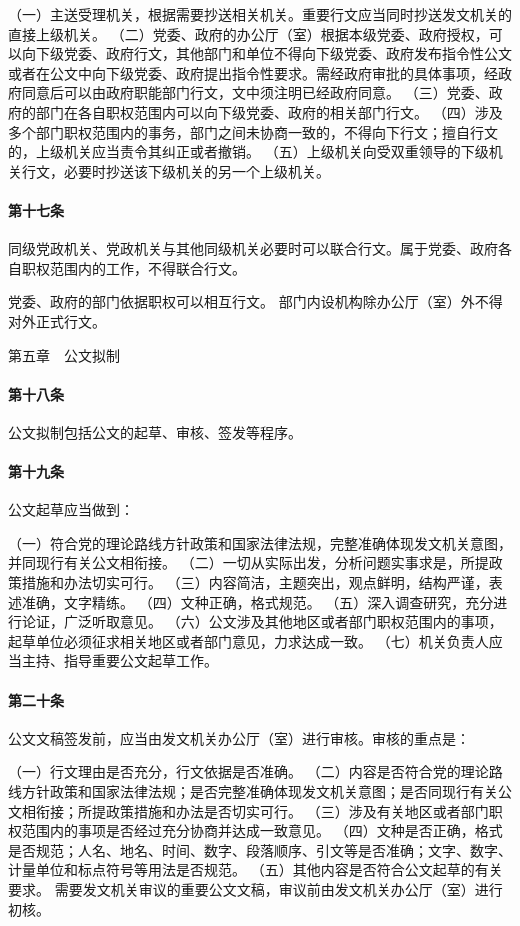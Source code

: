 \documentclass{gbt9704}
\begin{document}
（一）主送受理机关，根据需要抄送相关机关。重要行文应当同时抄送发文机关的直接上级机关。
（二）党委、政府的办公厅（室）根据本级党委、政府授权，可以向下级党委、政府行文，其他部门和单位不得向下级党委、政府发布指令性公文或者在公文中向下级党委、政府提出指令性要求。需经政府审批的具体事项，经政府同意后可以由政府职能部门行文，文中须注明已经政府同意。
（三）党委、政府的部门在各自职权范围内可以向下级党委、政府的相关部门行文。
（四）涉及多个部门职权范围内的事务，部门之间未协商一致的，不得向下行文；擅自行文的，上级机关应当责令其纠正或者撤销。
（五）上级机关向受双重领导的下级机关行文，必要时抄送该下级机关的另一个上级机关。
\paragraph{第十七条}
同级党政机关、党政机关与其他同级机关必要时可以联合行文。属于党委、政府各自职权范围内的工作，不得联合行文。

党委、政府的部门依据职权可以相互行文。
部门内设机构除办公厅（室）外不得对外正式行文。

第五章　公文拟制


\paragraph{第十八条}
公文拟制包括公文的起草、审核、签发等程序。

\paragraph{第十九条}
公文起草应当做到：

（一）符合党的理论路线方针政策和国家法律法规，完整准确体现发文机关意图，并同现行有关公文相衔接。
（二）一切从实际出发，分析问题实事求是，所提政策措施和办法切实可行。
（三）内容简洁，主题突出，观点鲜明，结构严谨，表述准确，文字精练。
（四）文种正确，格式规范。
（五）深入调查研究，充分进行论证，广泛听取意见。
（六）公文涉及其他地区或者部门职权范围内的事项，起草单位必须征求相关地区或者部门意见，力求达成一致。
（七）机关负责人应当主持、指导重要公文起草工作。
\paragraph{第二十条}
公文文稿签发前，应当由发文机关办公厅（室）进行审核。审核的重点是：

（一）行文理由是否充分，行文依据是否准确。
（二）内容是否符合党的理论路线方针政策和国家法律法规；是否完整准确体现发文机关意图；是否同现行有关公文相衔接；所提政策措施和办法是否切实可行。
（三）涉及有关地区或者部门职权范围内的事项是否经过充分协商并达成一致意见。
（四）文种是否正确，格式是否规范；人名、地名、时间、数字、段落顺序、引文等是否准确；文字、数字、计量单位和标点符号等用法是否规范。
（五）其他内容是否符合公文起草的有关要求。
需要发文机关审议的重要公文文稿，审议前由发文机关办公厅（室）进行初核。
\end{document}
